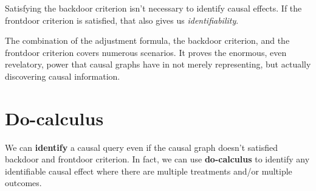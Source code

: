 Satisfying the backdoor criterion isn't necessary to identify causal effects. If
the frontdoor criterion is satisfied, that also gives us \textit{identifiability}.

The combination of the adjustment formula, the backdoor criterion, and the frontdoor
criterion covers numerous scenarios. It proves the enormous, even revelatory, power
that causal graphs have in not merely representing, but actually discovering causal
information.
\section{Do-calculus}
We can \textbf{identify} a causal query even if the causal graph doesn't satisfied
backdoor and frontdoor criterion. In fact, we can use \textbf{do-calculus} to
identify any identifiable causal effect where there are multiple treatments and/or
multiple outcomes.

